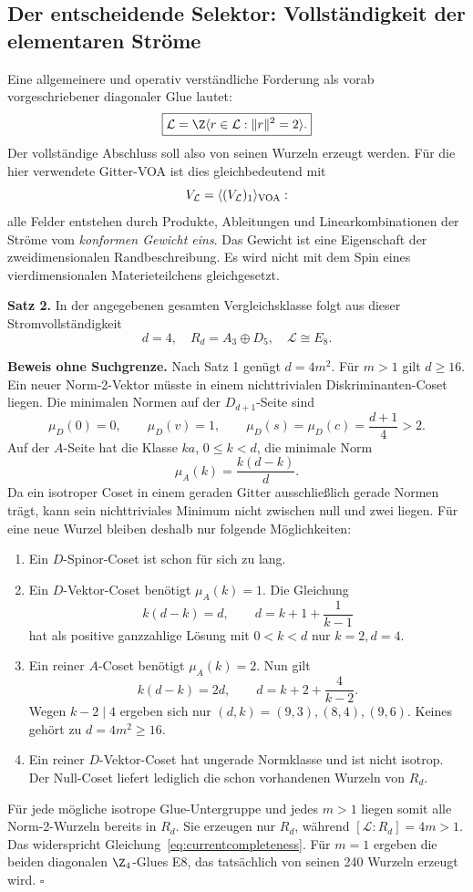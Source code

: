\subsection{Der entscheidende Selektor: Vollständigkeit der elementaren Ströme}

Eine allgemeinere und operativ verständliche Forderung als vorab vorgeschriebener diagonaler Glue lautet:
\begin{equation}\label{eq:currentcompleteness}
 \boxed{\mathcal L=\Z\langle r\in\mathcal L:\|r\|^2=2\rangle .}
\end{equation}
Der vollständige Abschluss soll also von seinen Wurzeln erzeugt werden. Für die hier verwendete Gitter-VOA ist dies gleichbedeutend mit
\[
 V_{\mathcal L}=\langle(V_{\mathcal L})_1\rangle_{\rm VOA}:
\]
alle Felder entstehen durch Produkte, Ableitungen und Linearkombinationen der Ströme vom \emph{konformen Gewicht eins}. Das Gewicht ist eine Eigenschaft der zweidimensionalen Randbeschreibung. Es wird nicht mit dem Spin eines vierdimensionalen Materieteilchens gleichgesetzt.

\textbf{Satz 2.} In der angegebenen gesamten Vergleichsklasse folgt aus dieser Stromvollständigkeit
\begin{equation}\label{eq:globalcurrentselection}
 \boxed{d=4,\quad R_d=A_3\oplus D_5,\quad\mathcal L\cong E_8.}
\end{equation}

\textbf{Beweis ohne Suchgrenze.} Nach Satz 1 genügt $d=4m^2$. Für $m>1$ gilt $d\ge16$. Ein neuer Norm-2-Vektor müsste in einem nichttrivialen Diskriminanten-Coset liegen. Die minimalen Normen auf der $D_{d+1}$-Seite sind
\[
 \mu_D(0)=0,\qquad\mu_D(v)=1,
 \qquad\mu_D(s)=\mu_D(c)=\frac{d+1}{4}>2.
\]
Auf der $A$-Seite hat die Klasse $ka$, $0\le k<d$, die minimale Norm
\[
 \mu_A(k)=\frac{k(d-k)}d.
\]
Da ein isotroper Coset in einem geraden Gitter ausschließlich gerade Normen trägt, kann sein nichttriviales Minimum nicht zwischen null und zwei liegen. Für eine neue Wurzel bleiben deshalb nur folgende Möglichkeiten:
\begin{enumerate}
\item Ein $D$-Spinor-Coset ist schon für sich zu lang.
\item Ein $D$-Vektor-Coset benötigt $\mu_A(k)=1$. Die Gleichung
\[
 k(d-k)=d,\qquad d=k+1+\frac1{k-1}
\]
hat als positive ganzzahlige Lösung mit $0<k<d$ nur $k=2,d=4$.
\item Ein reiner $A$-Coset benötigt $\mu_A(k)=2$. Nun gilt
\[
 k(d-k)=2d,\qquad d=k+2+\frac4{k-2}.
\]
Wegen $k-2\mid4$ ergeben sich nur $(d,k)=(9,3),(8,4),(9,6)$. Keines gehört zu $d=4m^2\ge16$.
\item Ein reiner $D$-Vektor-Coset hat ungerade Normklasse und ist nicht isotrop. Der Null-Coset liefert lediglich die schon vorhandenen Wurzeln von $R_d$.
\end{enumerate}
Für jede mögliche isotrope Glue-Untergruppe und jedes $m>1$ liegen somit alle Norm-2-Wurzeln bereits in $R_d$. Sie erzeugen nur $R_d$, während $[\mathcal L:R_d]=4m>1$. Das widerspricht Gleichung~\eqref{eq:currentcompleteness}. Für $m=1$ ergeben die beiden diagonalen $\Z_4$-Glues E8, das tatsächlich von seinen 240 Wurzeln erzeugt wird. $\square$


